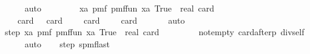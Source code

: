\begin{isabellebody}
\ \ \ \ \isamarkupfalse%
\ auto\isanewline
\ \ \isamarkupfalse%
\ \isamarkupfalse%
\isanewline
\ \ \ \ {\isachardoublequoteopen}{\isacharparenleft}{\kern0pt}{\isasymSum}xa{\isasymin}{\isacharquery}{\kern0pt}{\isasymK}{\isachardot}{\kern0pt}\ pmf\ {\isacharparenleft}{\kern0pt}{\isacharquery}{\kern0pt}pmf{\isacharunderscore}{\kern0pt}fun{\isacharprime}{\kern0pt}\ xa{\isacharparenright}{\kern0pt}\ True{\isacharparenright}{\kern0pt}\ {\isacharslash}{\kern0pt}\ real\ {\isacharparenleft}{\kern0pt}card\ {\isacharquery}{\kern0pt}{\isasymK}{\isacharparenright}{\kern0pt}\ {\isacharequal}{\kern0pt}\ \isanewline
\ \ \ \ {\isacharparenleft}{\kern0pt}{\isacharparenleft}{\kern0pt}card\ {\isacharquery}{\kern0pt}{\isasymK}{\isacharparenright}{\kern0pt}\ {\isacharasterisk}{\kern0pt}\ {\isacharparenleft}{\kern0pt}card\ {\isacharquery}{\kern0pt}{\isasymK}\ {\isacharminus}{\kern0pt}\ {}{\isacharparenright}{\kern0pt}{\isacharparenright}{\kern0pt}\ {\isacharslash}{\kern0pt}\ {\isacharparenleft}{\kern0pt}{\isacharparenleft}{\kern0pt}card\ {\isacharquery}{\kern0pt}{\isasymK}\ {\isacharminus}{\kern0pt}\ {}{\isacharparenright}{\kern0pt}\ {\isacharasterisk}{\kern0pt}\ {\isacharparenleft}{\kern0pt}card\ {\isacharquery}{\kern0pt}{\isasymK}{\isacharparenright}{\kern0pt}{\isacharparenright}{\kern0pt}{\isachardoublequoteclose}\isanewline
\ \ \ \ \isamarkupfalse%
\ auto\isanewline
\ \ \isamarkupfalse%
\ \isamarkupfalse%
\ step{\isacharunderscore}{\kern0pt}{}{\isacharcolon}{\kern0pt}\ {\isachardoublequoteopen}{\isacharparenleft}{\kern0pt}{\isasymSum}xa{\isasymin}{\isacharquery}{\kern0pt}{\isasymK}{\isachardot}{\kern0pt}\ pmf\ {\isacharparenleft}{\kern0pt}{\isacharquery}{\kern0pt}pmf{\isacharunderscore}{\kern0pt}fun{\isacharprime}{\kern0pt}\ xa{\isacharparenright}{\kern0pt}\ True{\isacharparenright}{\kern0pt}\ {\isacharslash}{\kern0pt}\ real\ {\isacharparenleft}{\kern0pt}card\ {\isacharquery}{\kern0pt}{\isasymK}{\isacharparenright}{\kern0pt}\ {\isacharequal}{\kern0pt}\ {}{\isachardoublequoteclose}\isanewline
\ \ \ \ \isamarkupfalse%
\ {\isasymK}{\isacharunderscore}{\kern0pt}not{\isacharunderscore}{\kern0pt}empty\ {\isasymK}{\isacharunderscore}{\kern0pt}card{\isacharunderscore}{\kern0pt}after{\isacharunderscore}{\kern0pt}p\ div{\isacharunderscore}{\kern0pt}self\isanewline
\ \ \ \ \isamarkupfalse%
\ auto\isanewline
\isanewline
\ \ \isamarkupfalse%
\ step{\isacharunderscore}{\kern0pt}{}\ spmf{\isacharunderscore}{\kern0pt}last\isanewline

\end{isabellebody}
